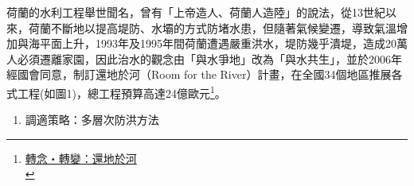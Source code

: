 \documentclass[a4paper,12pt]{article}
\begin{document}
\begin{enumerate}
荷蘭的水利工程舉世聞名，曾有「上帝造人、荷蘭人造陸」的說法，從13世紀以來，荷蘭不斷地以提高堤防、水壩的方式防堵水患，但隨著氣候變遷，導致氣溫增加與海平面上升，1993年及1995年間荷蘭遭遇嚴重洪水，堤防幾乎潰堤，造成20萬人必須遷離家園，因此治水的觀念由「與水爭地」改為「與水共生」，並於2006年經國會同意，制訂還地於河（Room for the River）計畫，在全國34個地區推展各式工程(如圖1)，總工程預算高達24億歐元\footnote{\href{https://epaper.land.gov.taipei/Item/Detail/\%E6\%89\%93\%E9\%80\%A0\%E9\%9F\%8C\%E6\%80\%A7\%E5\%9F\%8E\%E5\%B8\%82\%E2\%80\%94\%E8\%8D\%B7\%E8\%98\%AD\%E5\%A5\%88\%E6\%A2\%85\%E4\%BA\%A8\%E9\%82\%84\%E5\%9C\%B0\%E6\%96\%BC\%E6\%B2\%B3\%E8\%A8\%88\%E7\%95\%AB}{轉念・轉變：還地於河 }\\\label{orge044f49}}。\\

\begin{enumerate}
\item 調適策略：多層次防洪方法
\label{sec:org9a606ad}


\end{enumerate}
\end{enumerate}
\end{document}
